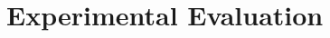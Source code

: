 \documentclass[sigconf]{acmart}
\begin{document}
\section{Experimental Evaluation}
\label{sec:experiments}
\end{document}
